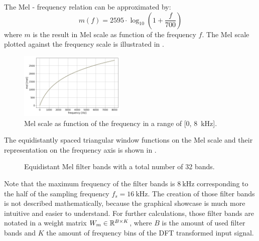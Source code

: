 The Mel - frequency relation can be approximated by:
\begin{equation}\label{eq:signal_mfcc_mel}
  m(f) = 2595 \cdot \log_{10} \left(1 + \frac{f}{700} \right) 
\end{equation}
where $m$ is the result in Mel scale as function of the frequency $f$.
The Mel scale plotted against the frequency scale is illustrated in .
\begin{figure}[!ht]
  \centering
  \includegraphics[width=0.45\textwidth]{./3_signal/figs/signal_mfcc_mel_scale.png}
  \caption{Mel scale as function of the frequency in a range of [0, \SI{8}{\kilo\hertz}].}
  \label{fig:signal_mfcc_mel_scale}
\end{figure}
\FloatBarrier
\noindent
The equidistantly spaced triangular window functions on the Mel scale and their representation on the frequency axis is shown in .
\begin{figure}[!ht]
  \centering
  \quad
  \caption{Equidistant Mel filter bands with a total number of 32 bands.}
  \label{fig:filter_bands}
\end{figure}
\FloatBarrier
\noindent
Note that the maximum frequency of the filter bands is $\SI{8}{\kilo\hertz}$ corresponding to the half of the sampling frequency $f_s = \SI{16}{\kilo\hertz}$.
The creation of those filter bands is not described mathematically, because the graphical showcase is much more intuitive and easier to understand.
For further calculations, those filter bands are notated in a weight matrix $W_m \in \mathbb{R}^{B \times K}$, where $B$ is the amount of used filter bands and $K$ the amount of frequency bins of the DFT transformed input signal.

